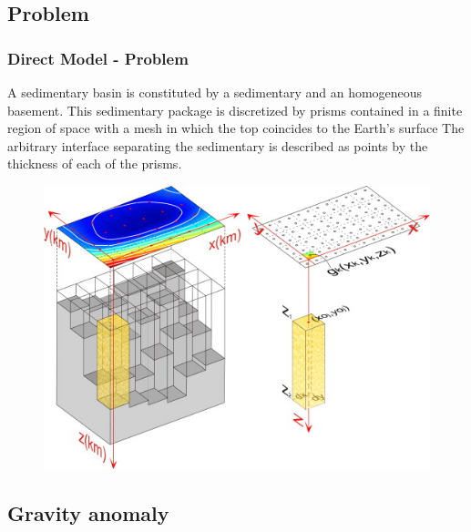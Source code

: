 \documentclass{beamer}
\begin{document}

\subsection{Problem} %

\begin{frame}
\frametitle{Direct Model - Problem}
A sedimentary basin is constituted by a sedimentary and an homogeneous basement. This sedimentary package is discretized by prisms contained in a finite region of space with a mesh in which the top coincides to the Earth's surface The arbitrary interface separating the sedimentary is described as points by the thickness of each of the prisms.
\begin{figure}[t!]
\begin{center}
\includegraphics[scale=.6]{./images/prism.png}
\end{center}
\caption{}
\label{fluxo_calor}
\end{figure}
\end{frame}


\subsection{Gravity anomaly} %
\end{document}
